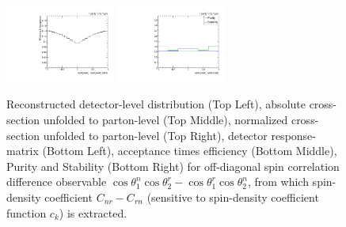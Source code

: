 \begin{figure}[htb]
\begin{center}
 \includegraphics[width=0.32\textwidth]{fig_fullRun2UL/unfolding/combined/TotEff_c_Mnr.pdf}
 \includegraphics[width=0.32\textwidth]{fig_fullRun2UL/unfolding/combined/PurStab_c_Mnr.pdf} \\
\caption{Reconstructed detector-level distribution (Top Left), absolute cross-section unfolded to parton-level (Top Middle), normalized cross-section unfolded to parton-level (Top Right), detector response-matrix (Bottom Left), acceptance times efficiency (Bottom Middle), Purity and Stability (Bottom Right) for off-diagonal spin correlation difference observable $\cos\theta_{1}^{n}\cos\theta_{2}^{r}-\cos\theta_{1}^{r}\cos\theta_{2}^{n}$, from which spin-density coefficient $C_{nr}-C_{rn}$ (sensitive to spin-density coefficient function $c_k$) is extracted.}
\label{fig:c_Mnr}
\end{center}
\end{figure}
\clearpage
